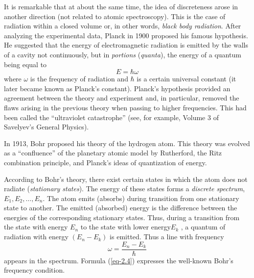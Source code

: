 \documentclass[a4paper,sfsidenotes,colorlinks=true]{tufte-book}
\numberwithin{equation}{section}
\numberwithin{figure}{section}
\begin{document}
It is remarkable that at about the same time, the idea of discreteness
arose in another direction (not related to atomic spectroscopy). This
is the case of radiation within a closed volume or, in other words,
\emph{black body radiation}. After analyzing the experimental data, Planck in
1900 proposed his famous hypothesis. He suggested that the energy of
electromagnetic radiation is emitted by the walls of a cavity not
continuously, but in \emph{portions} (\emph{quanta}), the energy of a
quantum being equal to 
\begin{equation}%
E = \hbar \omega 
\label{eq-2.3}
\end{equation}
where $\omega$ is the frequency of radiation and $\hbar$
is a certain universal constant (it later became known as Planck's
constant). Planck's hypothesis provided an agreement between the
theory and experiment and, in particular, removed the flaws arising in
the previous theory when passing to higher frequencies. This had been
called the ``ultraviolet catastrophe'' (see, for example, Volume 3 of
Savelyev's General Physics). \cite[-1cm]{savelyev-1980}

In 1913, Bohr proposed his theory of the hydrogen atom. This
theory was evolved as a ``confluence'' of the planetary atomic model
by Rutherford, the Ritz combination principle, and Planck's ideas of
quantization of energy.

According to Bohr's theory, there exist certain states in which the
atom does not radiate (\emph{stationary states}). The energy of these
states forms a \emph{discrete spectrum}, $E_{1}, E_{2}, \ldots,
E_{n}$. The atom emits (absorbs) during transition from one stationary
state to another. The emitted (absorbed) energy is the difference
between the energies of the corresponding stationary states. Thus,
during a transition from the state with energy $E_{n}$ to the state with
lower energy$ E_{k}$ , a quantum of radiation with energy $(E_{n} - E_{k})$ is
emitted. Thus a line with frequency 
\begin{equation}%
\omega = \frac{E_{n}- E_{k}}{\hbar} 
\label{eq-2.4}
\end{equation}
appears in the spectrum. Formula (\ref{eq-2.4}) expresses the
well-known Bohr's frequency condition.
\end{document}
